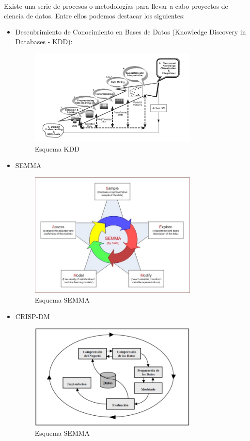 \documentclass[spanish,12pt, a4paper,twoside]{paper}
\begin{document}
\justify
Existe una serie de procesos o metodologías para llevar a cabo proyectos de ciencia de datos. Entre ellos podemos destacar los siguientes: 
\begin{itemize}
\item Descubrimiento de Conocimiento en Bases de Datos (Knowledge Discovery in Databases - KDD):
\begin{figure}[h]
\centering
 \includegraphics[width=0.8\textwidth]{recursos/KDDEsquema}
\caption{Esquema KDD}
\label{fig:EsquemaKDD}
\end{figure}
\item SEMMA
\begin{figure}[h]
\centering
 \includegraphics[width=0.8\textwidth]{recursos/SEMMA.jpg}
\caption{Esquema SEMMA}
\label{fig:EsquemaSEMMA}
\end{figure}
\FloatBarrier
\item CRISP-DM
\begin{figure}[h]
\centering
 \includegraphics[width=0.8\textwidth]{recursos/CRISPDMEsquema}
\caption{Esquema SEMMA}
\label{fig:CRISPDMEsquema}
\end{figure}
\FloatBarrier
\end{itemize}
\end{document}
